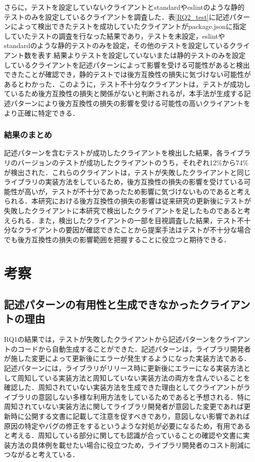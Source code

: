 \documentclass[11pt]{jreport}
\begin{document}
さらに，テストを設定していないクライアントとstandardやeslintのような静的テストのみを設定しているクライアントを調査した．表\ref{RQ2_test}に記述パターンによって検出できたテストを成功していたクライアントがpackage.jsonに指定していたテストの調査を行なった結果であり，テストを未設定，eslintやstandardのような静的テストのみを設定，その他のテストを設定しているクライアント数を表す.結果よりテストを設定していないまたは静的テストのみを設定しているクライアントを記述パターンによって影響を受ける可能性があると検出できたことが確認でき，静的テストでは後方互換性の損失に気づけない可能性があるとわかった．このように，テスト不十分なクライアントは，テストが成功しているため後方互換性の損失と関係がないと判断されるが，本手法が生成する記述パターンにより後方互換性の損失の影響を受ける可能性の高いクライアントをより正確に特定できる．
\subsection{結果のまとめ}
記述パターンを含むテストが成功したクライアントを検出した結果，各ライブラリのバージョンのテストが成功したクライアントのうち，それぞれ12\%から74\%が検出された．これらのクライアントは，テストが失敗したクライアントと同じライブラリの実装方法をしているため，後方互換性の損失の影響を受けている可能性が高いが，テストが不十分であったため影響に気づけないものであると考えられる．本研究における後方互換性の損失の影響は従来研究の更新後にテストが失敗したクライアントに本研究で検出したクライアントを足したものであると考えられる．また，検出したクライアントの一部を目視調査した結果，テスト不十分なクライアントの要因が確認できたことから提案手法はテストが不十分な場合でも後方互換性の損失の影響範囲を把握することに役立つと期待できる．

\chapter{考察}\label{sec:discussion}
\section{記述パターンの有用性と生成できなかったクライアントの理由}

RQ1の結果では，テストが失敗したクライアントから記述パターンをクライアントのコードから自動生成することができた．記述パターンは，ライブラリ開発者が施した変更によって更新後にエラーが発生するようになった実装方法である．記述パターンには，ライブラリがリリース時に更新後にエラーになる実装方法として周知している実装方法と周知していない実装方法の両方を含んでいることを確認した．周知されていない実装方法を生成できた理由としてクライアントがライブラリの意図しない多様な利用方法をしているためであると予想される．特に周知されていない実装方法に関してライブラリ開発者が意図した変更であれば更新時に公開する文書に記載して注意を促すべきであり，意図しない影響であれば原因の特定やバグの修正をするというような対処が必要になるため，有用であると考える．周知している部分に関しても認識が合っていることの確認や文書に実装方法の具体例を載せたい場合に役立つため，ライブラリ開発者のコスト削減につながると考えている．
\end{document}
